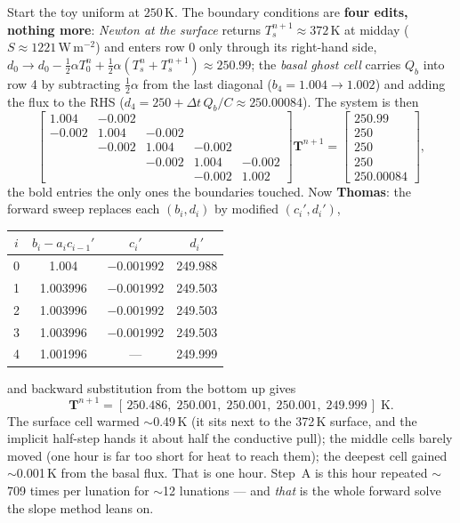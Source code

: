 \documentclass[11pt]{report}
\begin{document}
\noindent Start the toy uniform at $250$\,K. The boundary conditions are \textbf{four edits, nothing
more}: \emph{Newton at the surface} returns $T_s^{n+1}\approx372$\,K at midday
($S\approx1221$\,W\,m$^{-2}$) and enters row 0 only through its right-hand side,
$d_0\to d_0-\tfrac12\alpha T_0^n+\tfrac12\alpha(T_s^n+T_s^{n+1})\approx250.99$;
the \emph{basal ghost cell} carries $Q_b$ into row 4 by subtracting
$\tfrac12\alpha$ from the last diagonal ($b_4=1.004\to1.002$) and adding the flux
to the RHS ($d_4=250+\Delta t\,Q_b/C\approx250.00084$). The system is then
\[
\begin{bmatrix}
1.004 & -0.002 & & & \\
-0.002 & 1.004 & -0.002 & & \\
 & -0.002 & 1.004 & -0.002 & \\
 & & -0.002 & 1.004 & -0.002 \\
 & & & -0.002 & \mathbf{1.002}
\end{bmatrix}\mathbf{T}^{n+1}=
\begin{bmatrix}\mathbf{250.99}\\250\\250\\250\\\mathbf{250.00084}\end{bmatrix},
\]
the bold entries the only ones the boundaries touched. Now \textbf{Thomas}: the
forward sweep replaces each $(b_i,d_i)$ by modified $(c_i',d_i')$,
\begin{center}\small
\begin{tabular}{@{}cccc@{}}
\toprule
$i$ & $b_i-a_ic_{i-1}'$ & $c_i'$ & $d_i'$ \\
\midrule
0 & 1.004    & $-0.001992$ & 249.988 \\
1 & 1.003996 & $-0.001992$ & 249.503 \\
2 & 1.003996 & $-0.001992$ & 249.503 \\
3 & 1.003996 & $-0.001992$ & 249.503 \\
4 & 1.001996 & ---         & 249.999 \\
\bottomrule
\end{tabular}
\end{center}
and backward substitution from the bottom up gives
\[
\mathbf{T}^{n+1}=[\,250.486,\;250.001,\;250.001,\;250.001,\;249.999\,]\;\text{K}.
\]
The surface cell warmed $\sim$0.49\,K (it sits next to the 372\,K surface, and the
implicit half-step hands it about half the conductive pull); the middle cells
barely moved (one hour is far too short for heat to reach them); the deepest cell
gained $\sim$0.001\,K from the basal flux. That is one hour. Step~A is this hour
repeated $\sim$709 times per lunation for $\sim$12 lunations --- and \emph{that} is
the whole forward solve the slope method leans on.
\end{document}
